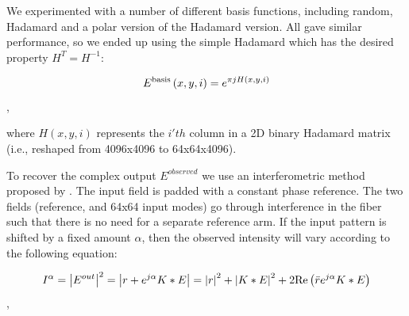 \documentclass[10pt]{article}
\begin{document}
We experimented with a number of different basis functions, including random, Hadamard and a polar version of the Hadamard version. All gave similar performance, so we ended up using the simple Hadamard which has the desired property $H^T = H^{-1}$:

\[{E^{{\rm{basis}}}}\left( {x,y,i} \right) = {e^{\pi jH(x,y,i)}}\],

where $H(x,y,i)$ represents the $i'th$ column in a 2D binary Hadamard matrix (i.e., reshaped from 4096x4096 to 64x64x4096).

To recover the complex output $E^{observed}$ we use an interferometric method proposed by \cite{Popoff2010-um}. The input field is padded with a constant phase reference. The two fields (reference, and 64x64 input modes) go through interference in the fiber such that there is no need for a separate reference arm. 
If the input pattern is shifted by a fixed amount $\alpha$, then the observed intensity will vary according to the following equation:

\[{I^\alpha } = {\left| {{E^{out}}} \right|^2} = \left| {r + {e^{j\alpha }}K*E} \right| = {\left| r \right|^2} + {\left| {K*E} \right|^2} + 2{\rm{Re}}\left( {\bar r{e^{j\alpha }}K*E} \right)\],
\end{document}
